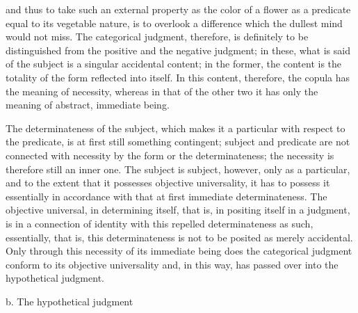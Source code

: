 and thus to take such an external property
as the color of a flower
as a predicate equal to its vegetable nature,
is to overlook a difference which
the dullest mind would not miss.
The categorical judgment, therefore, is
definitely to be distinguished from
the positive and the negative judgment;
in these, what is said of the subject is
a singular accidental content;
in the former, the content is
the totality of the form reflected into itself.
In this content, therefore, the copula has
the meaning of necessity,
whereas in that of the other two it has only
the meaning of abstract, immediate being.

The determinateness of the subject,
which makes it a particular
with respect to the predicate,
is at first still something contingent;
subject and predicate are not connected
with necessity by the form or the determinateness;
the necessity is therefore still an inner one.
The subject is subject, however, only as a particular,
and to the extent that it possesses objective universality,
it has to possess it essentially in accordance with
that at first immediate determinateness.
The objective universal, in determining itself,
that is, in positing itself in a judgment,
is in a connection of identity with this repelled
determinateness as such, essentially,
that is, this determinateness is not to
be posited as merely accidental.
Only through this necessity of its immediate being
does the categorical judgment conform
to its objective universality
and, in this way, has passed over
into the hypothetical judgment.

b. The hypothetical judgment

